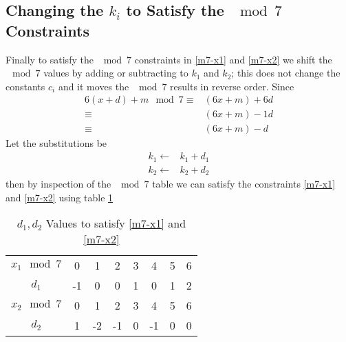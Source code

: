 \documentclass[a4paper,oneside,english]{article}
\numberwithin{equation}{section}
\numberwithin{figure}{section}
\numberwithin{table}{section}
\begin{document}
\subsection{Changing the $k_i$ to Satisfy the $\mod 7$ Constraints}
Finally to satisfy the $\mod 7$ constraints in \ref{m7-x1} and  \ref{m7-x2} we shift the $\mod 7$ values by adding or subtracting to $k_1$ and $k_2$; this does not change the constants $c_i$ and it moves the $\mod 7$ results in reverse order. Since 
\begin{align}
6(x+d)+m \mod 7 \equiv &(6x+m) +6d \\
\equiv & (6x+m) -1d\\
\equiv & (6x+m) -d
\end{align} 
Let the substitutions be 
\begin{align}
k_1 \leftarrow & k_1+d_1\\
k_2 \leftarrow & k_2+d_2
\end{align}
then by inspection of the $\mod 7$ table we can satisfy the constraints  \ref{m7-x1} and \ref{m7-x2} using table \ref{d-values}
\begin{table}[h] 	\caption{\label{d-values} $d_1, d_2$ Values to satisfy \ref{m7-x1} and \ref{m7-x2}  }
	\begin{center}
		\begin{tabular}{|c||ccccccc|}
			\hline
			$x_1 \mod 7$&0 &1 &2 &3 &4 &5 &6 \\
			$d_1$       &-1&0 &0 &1 &0 &1 &2\\
			\hline	\hline
			$x_2 \mod 7$&0 &1 &2 &3 &4 &5 &6 \\
			$d_2$       & 1&-2&-1& 0&-1&0 &0\\
			\hline
		\end{tabular}
	\end{center}
\end{table} 




 
\end{document}
